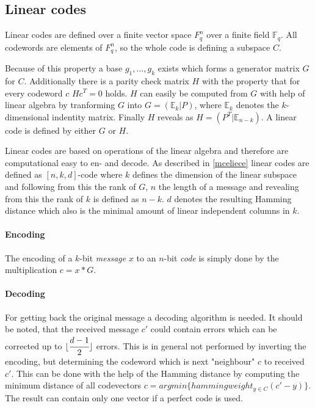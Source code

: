 \subsection*{Linear codes}
Linear codes are defined over a finite vector space $F^{n}_{q}$ over a finite field $\mathbb{F}_{q}$. All codewords are elements of $F^{n}_{q}$, so the whole code is defining  a subspace $C$.

Because of this property a base $g_1, ..., g_k$ exists which forms a generator matrix $G$ for $C$. Additionally there is a parity check matrix $H$ with the property that for every codeword $c$ $Hc^T = 0$ holds. $H$ can easily be computed from $G$ with help of linear algebra by tranforming $G$ into $G = (\mathbb{E}_k | P)$, where $\mathbb{E}_k$ denotes the $k$-dimensional indentity matrix. Finally $H$ reveals as $H = (P^T | \mathbb{E}_{n-k})$. A linear code is defined by either $G$ or $H$.

Linear codes are based on operations of the linear algebra and therefore are computational easy to en- and decode.
As described in \autoref{mceliece} linear codes are defined as $[n, k, d]$-code where $k$ defines the dimension of the linear subspace and following from this the rank of $G$, $n$ the length of a message and revealing from this the rank of $k$ is defined as $n - k$. $d$ denotes the resulting Hamming distance which also is the minimal amount of linear independent columns in $k$.\cite{schonfeld2012informations}

\paragraph*{Encoding}
The encoding of a $k$-bit \textit{message} $x$ to an $n$-bit \textit{code} is simply done by the multiplication $c = x * G$.

\paragraph*{Decoding}
\label{alg_decoding}
For getting back the original message a decoding algorithm is needed. It should be noted, that the received message $c'$ could contain errors which can be corrected up to $\lfloor \cfrac{d - 1}{2}\rfloor$ errors. This is in general not performed by inverting the encoding, but determining the codeword which is next "neighbour" $c$ to received $c'$. This can be done with the help of the Hamming distance by computing the minimum distance of all codevectors $c = argmin\{hammingweight_{y\in C}(c' - y)\}$. The result can contain only one vector if a perfect code is used. 

